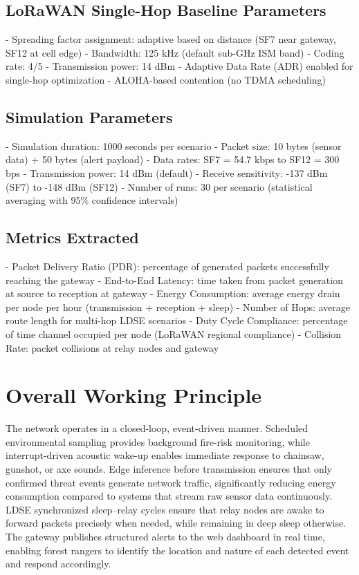 \subsection{LoRaWAN Single-Hop Baseline Parameters}
- Spreading factor assignment: adaptive based on distance (SF7 near gateway, SF12 at cell edge)
- Bandwidth: 125 kHz (default sub-GHz ISM band)
- Coding rate: 4/5
- Transmission power: 14 dBm
- Adaptive Data Rate (ADR) enabled for single-hop optimization
- ALOHA-based contention (no TDMA scheduling)

\subsection{Simulation Parameters}
- Simulation duration: 1000 seconds per scenario
- Packet size: 10 bytes (sensor data) + 50 bytes (alert payload)
- Data rates: SF7 = 54.7 kbps to SF12 = 300 bps
- Transmission power: 14 dBm (default)
- Receive sensitivity: -137 dBm (SF7) to -148 dBm (SF12)
- Number of runs: 30 per scenario (statistical averaging with 95\% confidence intervals)

\subsection{Metrics Extracted}
- Packet Delivery Ratio (PDR): percentage of generated packets successfully reaching the gateway
- End-to-End Latency: time taken from packet generation at source to reception at gateway
- Energy Consumption: average energy drain per node per hour (transmission + reception + sleep)
- Number of Hops: average route length for multi-hop LDSE scenarios
- Duty Cycle Compliance: percentage of time channel occupied per node (LoRaWAN regional compliance)
- Collision Rate: packet collisions at relay nodes and gateway

\section{Overall Working Principle}
The network operates in a closed-loop, event-driven manner. Scheduled
environmental sampling provides background fire-risk monitoring, while
interrupt-driven acoustic wake-up enables immediate response to chainsaw,
gunshot, or axe sounds. Edge inference before transmission ensures that only
confirmed threat events generate network traffic, significantly reducing
energy consumption compared to systems that stream raw sensor data
continuously. LDSE synchronized sleep--relay cycles ensure that relay nodes
are awake to forward packets precisely when needed, while remaining in deep
sleep otherwise. The gateway publishes structured alerts to the web dashboard
in real time, enabling forest rangers to identify the location and nature of
each detected event and respond accordingly.

